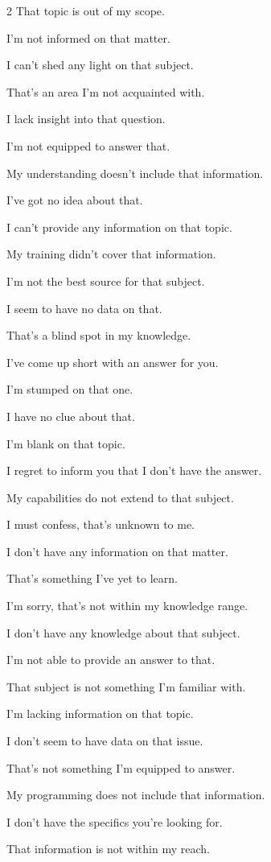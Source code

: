\begin{multicols}{2}
That topic is out of my scope.

I'm not informed on that matter.

I can't shed any light on that subject.

That's an area I'm not acquainted with.

I lack insight into that question.

I'm not equipped to answer that.

My understanding doesn't include that information.

I've got no idea about that.

I can't provide any information on that topic.

My training didn't cover that information.

I'm not the best source for that subject.

I seem to have no data on that.

That's a blind spot in my knowledge.

I've come up short with an answer for you.

I'm stumped on that one.

I have no clue about that.

I'm blank on that topic.

I regret to inform you that I don't have the answer.


 My capabilities do not extend to that subject.

 I must confess, that's unknown to me.

 I don't have any information on that matter.

 That's something I've yet to learn.

 I'm sorry, that's not within my knowledge range.

 I don't have any knowledge about that subject.

 I'm not able to provide an answer to that.

 That subject is not something I'm familiar with.

 I'm lacking information on that topic.

 I don't seem to have data on that issue.

 That's not something I'm equipped to answer.

 My programming does not include that information.

 I don't have the specifics you're looking for.
    
 That information is not within my reach.


\end{multicols}
